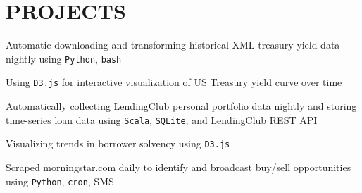 \documentclass[]{deedy-resume-openfont}
\begin{document}
\sectionsep



\section{PROJECTS}



\begin{tightemize}

\item Automatic downloading and transforming historical XML treasury yield data nightly using \verb|Python|, \verb|bash|

\item Using \verb|D3.js| for interactive visualization of US Treasury yield curve over time

\end{tightemize}


\sectionsep



\begin{tightemize}

\item Automatically collecting LendingClub personal portfolio data nightly and storing time-series loan data using \verb|Scala|, \verb|SQLite|, and LendingClub REST API

\item Visualizing trends in borrower solvency using \verb|D3.js|

\end{tightemize}


\sectionsep




\begin{tightemize}

\item Scraped morningstar.com daily to identify and broadcast buy/sell opportunities using \verb|Python|, \verb|cron|, SMS


\end{tightemize}
\end{document}
